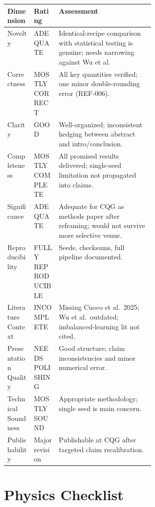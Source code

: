 \documentclass[11pt]{article}
\begin{document}
\begin{longtable}{@{}p{0.18\linewidth}p{0.17\linewidth}Y@{}}
\toprule
\textbf{Dimension} & \textbf{Rating} & \textbf{Assessment} \\
\midrule
\endhead
Novelty & ADEQUATE & Identical-recipe comparison with statistical testing is genuine; needs narrowing against Wu et al. \\
Correctness & MOSTLY CORRECT & All key quantities verified; one minor double-rounding error (REF-006). \\
Clarity & GOOD & Well-organized; inconsistent hedging between abstract and intro/conclusion. \\
Completeness & MOSTLY COMPLETE & All promised results delivered; single-seed limitation not propagated into claims. \\
Significance & ADEQUATE & Adequate for CQG as methods paper after reframing; would not survive more selective venue. \\
Reproducibility & FULLY REPRODUCIBLE & Seeds, checksums, full pipeline documented. \\
Literature Context & INCOMPLETE & Missing Cuoco et al.\ 2025; Wu et al.\ outdated; imbalanced-learning lit not cited. \\
Presentation Quality & NEEDS POLISHING & Good structure; claim inconsistencies and minor numerical error. \\
Technical Soundness & MOSTLY SOUND & Appropriate methodology; single seed is main concern. \\
Publishability & Major revision & Publishable at CQG after targeted claim recalibration. \\
\bottomrule
\end{longtable}


\section*{Physics Checklist}
\end{document}
